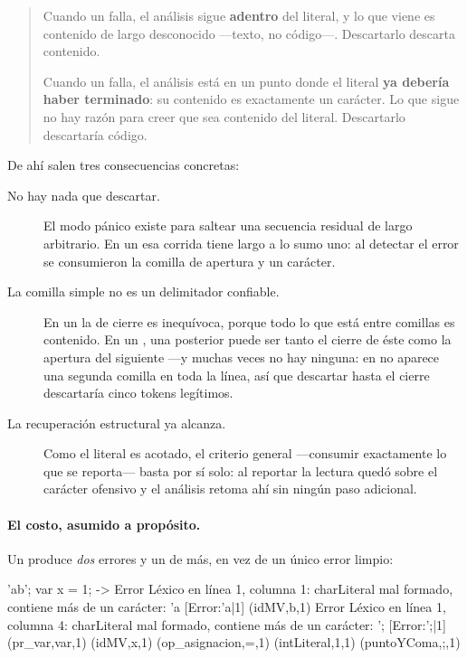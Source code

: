 \documentclass[11pt,a4paper]{article}
\begin{document}
\begin{quote}
Cuando un  falla, el análisis sigue \textbf{adentro} del literal, y lo que viene es
contenido de largo desconocido ---texto, no código---. Descartarlo descarta contenido.

Cuando un  falla, el análisis está en un punto donde el literal \textbf{ya debería
haber terminado}: su contenido es exactamente un carácter. Lo que sigue no hay razón para creer que
sea contenido del literal. Descartarlo descartaría código.
\end{quote}

De ahí salen tres consecuencias concretas:

\begin{description}
	\item[No hay nada que descartar.] El modo pánico existe para saltear una secuencia residual de largo
  arbitrario. En un  esa corrida tiene largo a lo sumo uno: al detectar el error se
  consumieron la comilla de apertura y un carácter.
\item[La comilla simple no es un delimitador confiable.] En un  la  de cierre
  es inequívoca, porque todo lo que está entre comillas es contenido. En un , una
   posterior puede ser tanto el cierre de éste como la apertura del siguiente ---y muchas
  veces no hay ninguna: en  no aparece una segunda comilla en toda la línea, así que
  descartar hasta el cierre descartaría cinco tokens legítimos.
\item[La recuperación estructural ya alcanza.] Como el literal es acotado, el criterio general
  ---consumir exactamente lo que se reporta--- basta por sí solo: al reportar  la lectura
  quedó sobre el carácter ofensivo y el análisis retoma ahí sin ningún paso adicional.
\end{description}

\paragraph{El costo, asumido a propósito.} Un  produce \emph{dos} errores y un
 de más, en vez de un único error limpio:

\begin{codigoLlano}
'ab'; var x = 1;
  -> Error Léxico en línea 1, columna 1: charLiteral mal formado, contiene más de un carácter: 'a
     [Error:'a|1]
     (idMV,b,1)
     Error Léxico en línea 1, columna 4: charLiteral mal formado, contiene más de un carácter: ';
     [Error:';|1]
     (pr_var,var,1) (idMV,x,1) (op_asignacion,=,1) (intLiteral,1,1) (puntoYComa,;,1)
\end{codigoLlano}
\end{document}
